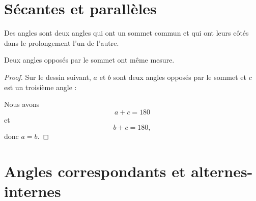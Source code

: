 

\section{Sécantes et parallèles}


\begin{definition}
    Des angles  sont deux angles qui ont un sommet commun et qui ont leurs côtés dans le prolongement l'un de l'autre.
\end{definition}

\begin{propriete}
    Deux angles opposés par le sommet ont même mesure.
    \begin{center}
        
    \end{center}
\end{propriete}

\begin{proof}
    Sur le dessin suivant, \( a\) et \(b\) sont deux angles opposés par le sommet et \( c\) est un troisième angle :

\begin{center}
    
\end{center}

Nous avons
\begin{equation}
    a+c=180
\end{equation}
et
\begin{equation}
    b+c=180,
\end{equation}
donc \( a=b\).

\end{proof}


\section{Angles correspondants et alternes-internes}


